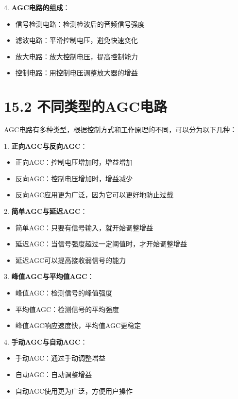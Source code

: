 \documentclass[12pt,UTF8]{ctexbook}
\begin{document}
4. \textbf{AGC电路的组成}：
   \begin{itemize}[leftmargin=3.5em]
   \item 信号检测电路：检测检波后的音频信号强度
   \item 滤波电路：平滑控制电压，避免快速变化
   \item 放大电路：放大控制电压，提高控制能力
   \item 控制电路：用控制电压调整放大器的增益
   \end{itemize}

\section*{15.2 不同类型的AGC电路}

AGC电路有多种类型，根据控制方式和工作原理的不同，可以分为以下几种：

1. \textbf{正向AGC与反向AGC}：
   \begin{itemize}[leftmargin=3.5em]
   \item 正向AGC：控制电压增加时，增益增加
   \item 反向AGC：控制电压增加时，增益减少
   \item 反向AGC应用更为广泛，因为它可以更好地防止过载
   \end{itemize}

2. \textbf{简单AGC与延迟AGC}：
   \begin{itemize}[leftmargin=3.5em]
   \item 简单AGC：只要有信号输入，就开始调整增益
   \item 延迟AGC：当信号强度超过一定阈值时，才开始调整增益
   \item 延迟AGC可以提高接收弱信号的能力
   \end{itemize}

3. \textbf{峰值AGC与平均值AGC}：
   \begin{itemize}[leftmargin=3.5em]
   \item 峰值AGC：检测信号的峰值强度
   \item 平均值AGC：检测信号的平均强度
   \item 峰值AGC响应速度快，平均值AGC更稳定
   \end{itemize}

4. \textbf{手动AGC与自动AGC}：
   \begin{itemize}[leftmargin=3.5em]
   \item 手动AGC：通过手动调整增益
   \item 自动AGC：自动调整增益
   \item 自动AGC使用更为广泛，方便用户操作
   \end{itemize}
\end{document}
